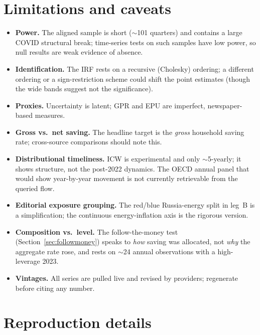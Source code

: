 \documentclass[11pt,a4paper]{article}
\begin{document}
\section{Limitations and caveats}\label{sec:limits}
\begin{itemize}
  \item \textbf{Power.} The aligned sample is short ($\sim$101 quarters) and
  contains a large COVID structural break; time-series tests on such samples have
  low power, so null results are weak evidence of absence.
  \item \textbf{Identification.} The IRF rests on a recursive (Cholesky)
  ordering; a different ordering or a sign-restriction scheme could shift the
  point estimates (though the wide bands suggest not the significance).
  \item \textbf{Proxies.} Uncertainty is latent; GPR and EPU are imperfect,
  newspaper-based measures.
  \item \textbf{Gross vs.\ net saving.} The headline target is the \emph{gross}
  household saving rate; cross-source comparisons should note this.
  \item \textbf{Distributional timeliness.} ICW is experimental and only
  $\sim$5-yearly; it shows structure, not the post-2022 dynamics. The OECD annual
  panel that would show year-by-year movement is not currently retrievable from
  the queried flow.
  \item \textbf{Editorial exposure grouping.} The red/blue Russia-energy split in
  leg~B is a simplification; the continuous energy-inflation axis is the rigorous
  version.
  \item \textbf{Composition vs.\ level.} The follow-the-money test
  (Section~\ref{sec:followmoney}) speaks to \emph{how} saving was allocated, not
  \emph{why} the aggregate rate rose, and rests on $\sim$24 annual observations
  with a high-leverage 2023.
  \item \textbf{Vintages.} All series are pulled live and revised by providers;
  regenerate before citing any number.
\end{itemize}

\appendix
\section{Reproduction details}
\end{document}

